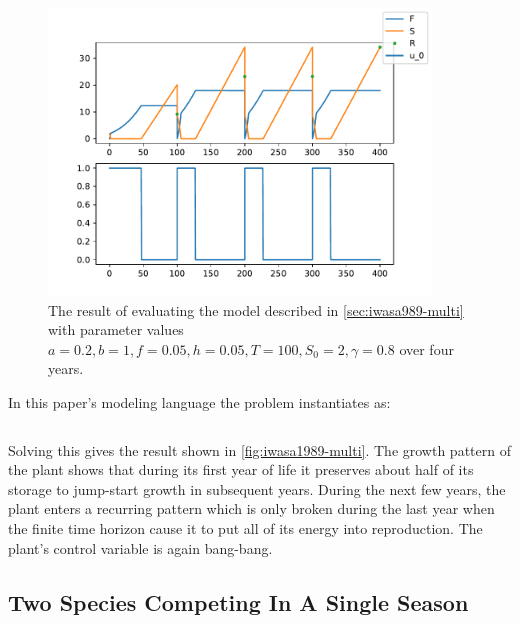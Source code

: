 \documentclass{article}
\begin{document}
\begin{figure}
\centering
\includegraphics[width=4in]{imgs/Iwasa1989_multi_season.pdf}
\caption{The result of evaluating the model described in \autoref{sec:iwasa989-multi} with parameter values $a=0.2, b=1, f=0.05, h=0.05, T=100, S_0=2, \gamma=0.8$ over four years. \label{fig:iwasa1989-multi}}
\end{figure}

In this paper's modeling language the problem instantiates as:

\inputminted[firstline=3,frame=single,linenos]{python}{src/Iwasa1989_multi_season.py}

Solving this gives the result shown in \autoref{fig:iwasa1989-multi}. The growth pattern of the plant shows that during its first year of life it preserves about half of its storage to jump-start growth in subsequent years. During the next few years, the plant enters a recurring pattern which is only broken during the last year when the finite time horizon cause it to put all of its energy into reproduction. The plant's control variable is again bang-bang.


\subsection{Two Species Competing In A Single Season}

\end{document}
